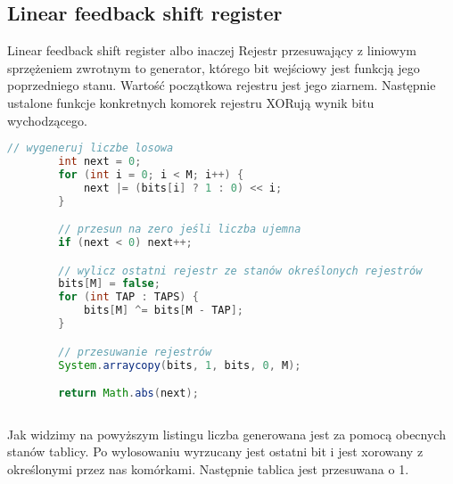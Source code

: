 \documentclass[a4paper, 11pt]{article} %
\begin{document}
\subsection{Linear feedback shift register}
Linear feedback shift register albo inaczej Rejestr przesuwający z liniowym sprzężeniem zwrotnym to generator, którego bit wejściowy jest funkcją jego poprzedniego stanu. Wartość początkowa rejestru jest jego ziarnem. Następnie ustalone funkcje konkretnych komorek rejestru XORują wynik bitu wychodzącego.
\begin{lstlisting}[style=mystyle, language=java, frame=single, caption = generowanie liczby za pomocą LFSR i przesuwanie komórek.] 
        // wygeneruj liczbe losowa
        int next = 0;
        for (int i = 0; i < M; i++) {
            next |= (bits[i] ? 1 : 0) << i;
        }

        // przesun na zero jeśli liczba ujemna
        if (next < 0) next++;

        // wylicz ostatni rejestr ze stanów określonych rejestrów
        bits[M] = false;
        for (int TAP : TAPS) {
            bits[M] ^= bits[M - TAP];
        }

        // przesuwanie rejestrów
        System.arraycopy(bits, 1, bits, 0, M);

        return Math.abs(next);
    
\end{lstlisting}
Jak widzimy na powyższym listingu liczba generowana jest za pomocą obecnych stanów tablicy. Po wylosowaniu wyrzucany jest ostatni bit i jest xorowany z określonymi przez nas komórkami. Następnie tablica jest przesuwana o 1.
\end{document}
